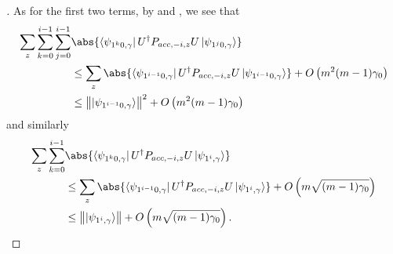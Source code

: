 \begin{proof}[]
	As for the first two terms, by  and , we see that
	\begin{align*}
		\sum_z \sum_{k=0}^{i-1}\sum_{j=0}^{i-1}
		&\abs{\bra{\psi_{1^k0,\gamma}}U^\dag  P_{acc,-i,z}U \ket{\psi_{1^j0,\gamma}}} \\
		&\leq\sum_z \abs{\bra{\psi_{1^{i-1}0,\gamma}}U^\dag  P_{acc,-i,z}U \ket{\psi_{1^{i-1}0,\gamma}}} + O\L(m^2(m-1)\gamma_0\R) \\
		&\leq\norm{\ket{\psi_{1^{i-1}0,\gamma}}}^2 + O\L(m^2(m-1)\gamma_0\R)
	\end{align*}
	and similarly
	\begin{align*}
		\sum_z\sum_{k=0}^{i-1}
		&\abs{\bra{\psi_{1^k0,\gamma}}U^\dag  P_{acc,-i,z}U \ket{\psi_{1^i,\gamma}}}\\
		&\leq\sum_z\abs{\bra{\psi_{1^{i-1}0,\gamma}}U^\dag  P_{acc,-i,z}U \ket{\psi_{1^i,\gamma}}}+O\L(m\sqrt{(m-1)\gamma_0}\R)\\
		&\leq\norm{\ket{\psi_{1^i,\gamma}}}+O\L(m\sqrt{(m-1)\gamma_0}\R).
	\end{align*}
\end{proof}


